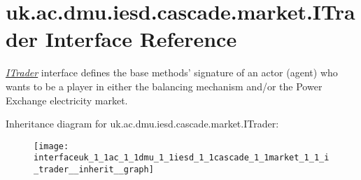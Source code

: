 \hypertarget{interfaceuk_1_1ac_1_1dmu_1_1iesd_1_1cascade_1_1market_1_1_i_trader}{\section{uk.\-ac.\-dmu.\-iesd.\-cascade.\-market.\-I\-Trader Interface Reference}
\label{interfaceuk_1_1ac_1_1dmu_1_1iesd_1_1cascade_1_1market_1_1_i_trader}
}


{\itshape \hyperlink{interfaceuk_1_1ac_1_1dmu_1_1iesd_1_1cascade_1_1market_1_1_i_trader}{I\-Trader}} interface defines the base methods' signature of an actor (agent) who wants to be a player in either the balancing mechanism and/or the {\ttfamily Power Exchange} electricity market.  




Inheritance diagram for uk.\-ac.\-dmu.\-iesd.\-cascade.\-market.\-I\-Trader\-:\nopagebreak
\begin{figure}[H]
\begin{center}
\leavevmode
\texttt{[image: interfaceuk\_1\_1ac\_1\_1dmu\_1\_1iesd\_1\_1cascade\_1\_1market\_1\_1\_i\_trader\_\_inherit\_\_graph]}
\end{center}
\end{figure}
